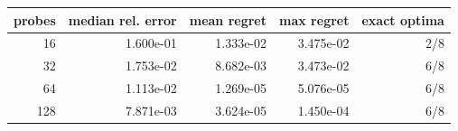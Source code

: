 \begin{tabular}{rrrrr}
\toprule
probes & median rel. error & mean regret & max regret & exact optima\\
\midrule
16 & 1.600e-01 & 1.333e-02 & 3.475e-02 & 2/8\\
32 & 1.753e-02 & 8.682e-03 & 3.473e-02 & 6/8\\
64 & 1.113e-02 & 1.269e-05 & 5.076e-05 & 6/8\\
128 & 7.871e-03 & 3.624e-05 & 1.450e-04 & 6/8\\
\bottomrule
\end{tabular}
